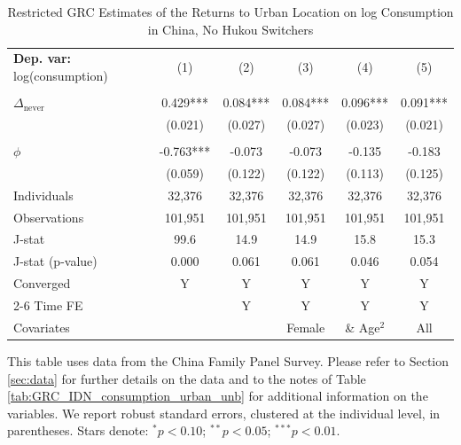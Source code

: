 \begin{table}[htbp] \centering \begin{threeparttable}
 \caption{Restricted GRC Estimates of the Returns to Urban Location on log Consumption in China, No Hukou Switchers} 
 \label{tab:GRC_CHN_same_consumption_urban_unb} 
\begin{tabular}{l ccccc} \toprule  \textbf{Dep. var:}  log(consumption) 
                    &\multicolumn{1}{c}{(1)}   &\multicolumn{1}{c}{(2)}   &\multicolumn{1}{c}{(3)}   &\multicolumn{1}{c}{(4)}   &\multicolumn{1}{c}{(5)}   \\
                    &               &               &               &               &               \\
\addlinespace
$\Delta_{\text{never}}$&       0.429***&       0.084***&       0.084***&       0.096***&       0.091***\\
                    &     (0.021)   &     (0.027)   &     (0.027)   &     (0.023)   &     (0.021)   \\
                    &               &               &               &               &               \\
\addlinespace
$\phi$              &      -0.763***&      -0.073   &      -0.073   &      -0.135   &      -0.183   \\
                    &     (0.059)   &     (0.122)   &     (0.122)   &     (0.113)   &     (0.125)   \\
\addlinespace
Individuals         &      32,376   &      32,376   &      32,376   &      32,376   &      32,376   \\
Observations        &     101,951   &     101,951   &     101,951   &     101,951   &     101,951   \\
J-stat              &        99.6   &        14.9   &        14.9   &        15.8   &        15.3   \\
J-stat (p-value)    &       0.000   &       0.061   &       0.061   &       0.046   &       0.054   \\
Converged           &           Y   &           Y   &           Y   &           Y   &           Y   \\
\cmidrule{2-6} Time FE & & Y & Y & Y & Y \\ Covariates & & & Female & \& Age$^2$ & All \\ \bottomrule \end{tabular} \begin{tablenotes}[flushleft] \footnotesize \item{This table uses data from the China Family Panel Survey. Please refer to Section \ref{sec:data} for further details on the data and to the notes of Table \ref{tab:GRC_IDN_consumption_urban_unb} for additional information on the variables. We report robust standard errors, clustered at the individual level, in parentheses. Stars denote: $^{*} p<0.10$; $^{**} p<0.05$; $^{***} p<0.01$.} \end{tablenotes} \end{threeparttable} \end{table}
